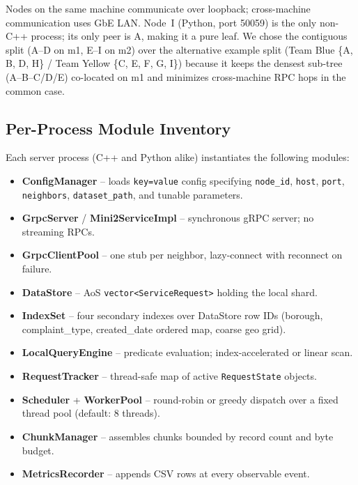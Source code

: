 \documentclass[conference]{IEEEtran}
\begin{document}
Nodes on the same machine communicate over loopback; cross-machine communication
uses GbE LAN. Node~I (Python, port 50059) is the only non-C++ process; its
only peer is A, making it a pure leaf. We chose the contiguous split
(A--D on m1, E--I on m2) over the alternative example split
(Team Blue \{A, B, D, H\} / Team Yellow \{C, E, F, G, I\}) because it
keeps the densest sub-tree (A--B--C/D/E) co-located on m1 and minimizes
cross-machine RPC hops in the common case.

\subsection{Per-Process Module Inventory}

Each server process (C++ and Python alike) instantiates the following modules:

\begin{itemize}
  \item \textbf{ConfigManager} -- loads \texttt{key=value} config specifying
        \texttt{node\_id}, \texttt{host}, \texttt{port}, \texttt{neighbors},
        \texttt{dataset\_path}, and tunable parameters.
  \item \textbf{GrpcServer} / \textbf{Mini2ServiceImpl} -- synchronous gRPC
        server; no streaming RPCs.
  \item \textbf{GrpcClientPool} -- one stub per neighbor, lazy-connect with
        reconnect on failure.
  \item \textbf{DataStore} -- AoS \texttt{vector\textless ServiceRequest\textgreater}
        holding the local shard.
  \item \textbf{IndexSet} -- four secondary indexes over DataStore row IDs
        (borough, complaint\_type, created\_date ordered map, coarse geo grid).
  \item \textbf{LocalQueryEngine} -- predicate evaluation; index-accelerated or
        linear scan.
  \item \textbf{RequestTracker} -- thread-safe map of active \texttt{RequestState}
        objects.
  \item \textbf{Scheduler} + \textbf{WorkerPool} -- round-robin or greedy
        dispatch over a fixed thread pool (default: 8 threads).
  \item \textbf{ChunkManager} -- assembles chunks bounded by record count and
        byte budget.
  \item \textbf{MetricsRecorder} -- appends CSV rows at every observable event.
\end{itemize}
\end{document}
